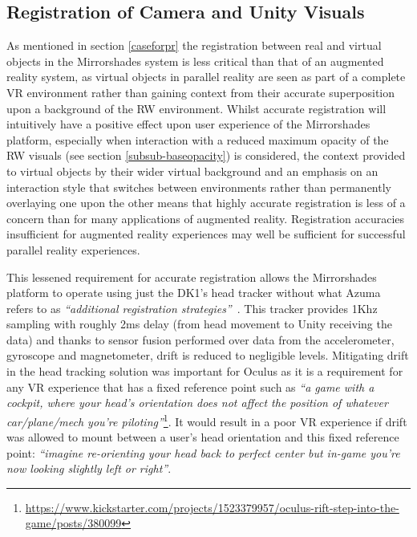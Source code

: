 \subsection{Registration of Camera and Unity Visuals}
\label{registration-of-camera-and-unity-visuals}
As mentioned in section \ref{caseforpr} the registration between real and virtual objects in the Mirrorshades system is less critical than that of an augmented reality system, as virtual objects in parallel reality are seen as part of a complete VR environment rather than gaining context from their accurate superposition upon a background of the RW environment. Whilst accurate registration will intuitively have a positive effect upon user experience of the Mirrorshades platform, especially when interaction with a reduced maximum opacity of the RW visuals (see section \ref{subsub-baseopacity}) is considered, the context provided to virtual objects by their wider virtual background and an emphasis on an interaction style that switches between environments rather than permanently overlaying one upon the other means that highly accurate registration is less of a concern than for many applications of augmented reality. Registration accuracies insufficient for augmented reality experiences may well be sufficient for successful parallel reality experiences.

This lessened requirement for accurate registration allows the Mirrorshades platform to operate using just the DK1's head tracker without what Azuma refers to as \textit{``additional registration strategies''}~\cite{Azuma1997}. This tracker provides 1Khz sampling with roughly 2ms delay (from head movement to Unity receiving the data) and thanks to sensor fusion performed over data from the accelerometer, gyroscope and magnetometer, drift is reduced to negligible levels. Mitigating drift in the head tracking solution was important for Oculus as it is a requirement for any VR experience that has a fixed reference point such as \textit{``a game with a cockpit, where your head's orientation does not affect the position of whatever car/plane/mech you're piloting''}\footnote{\url{https://www.kickstarter.com/projects/1523379957/oculus-rift-step-into-the-game/posts/380099}}\saveFN\rifttrackerfn. It would result in a poor VR experience if drift was allowed to mount between a user's head orientation and this fixed reference point: \textit{``imagine re-orienting your head back to perfect center but in-game you're now looking slightly left or right''}\useFN\rifttrackerfn .


